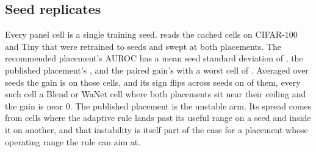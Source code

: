 \documentclass[../main.tex]{subfiles}
\begin{document}
\subsection{Seed replicates}

Every panel cell is a single training seed.  reads the \SeedCells{} cached cells on CIFAR-100 and Tiny that were retrained to \SeedsPerCell{} seeds and swept at both placements. The recommended placement's AUROC has a mean seed standard deviation of \SeedSdRecommended{}, the published placement's \SeedSdPublished{}, and the paired gain's \SeedSdGain{} with a worst cell of \SeedSdGainMax{}. Averaged over seeds the gain is \SeedGainMean{} on those cells, and its sign flips across seeds on \SeedGainSignFlips{} of them, every such cell a Blend or WaNet cell where both placements sit near their ceiling and the gain is near $0$. The published placement is the unstable arm. Its spread comes from cells where the adaptive rule lands past its useful range on a seed and inside it on another, and that instability is itself part of the case for a placement whose operating range the rule can aim at.


\end{document}

